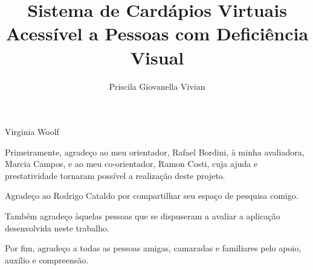 \documentclass[portuguese,oneside]{tcc}
\author{Priscila Giovanella Vivian}
\title{Sistema de Cardápios Virtuais Acessível a Pessoas com Deficiência Visual}
	{A Virtual Menu System Accessible to Visually Impaired People}
\begin{document}
		
		
		{Virginia Woolf}
		
		
		\begin{agradecimentos}
			Primeiramente, agradeço ao meu orientador, Rafael Bordini, à minha avaliadora, Marcia Campos, e ao meu co-orientador, Ramon Costi, cuja ajuda e prestatividade tornaram possível a realização deste projeto.
			
			Agradeço ao Rodrigo Cataldo por compartilhar seu espaço de pesquisa comigo.
			
			Também agradeço àquelas pessoas que se dispuseram a avaliar a aplicação desenvolvida neste trabalho.
			
			Por fim, agradeço a todas as pessoas amigas, camaradas e familiares pelo apoio, auxílio e compreensão.
		\end{agradecimentos}
		
\end{document}
